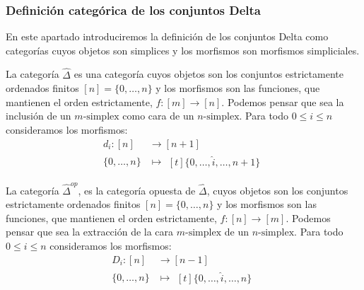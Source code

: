 \documentclass[../main.tex]{subfiles}
\begin{document}
\subsubsection{Definici\'on categ\'orica de los conjuntos Delta}
En este apartado introduciremos la definici\'on de los conjuntos Delta como categor\'ias cuyos objetos son simplices y los morfismos son morfismos simpliciales.
\begin{defi}
    La categor\'ia $\hat{\Delta}$ es una categor\'ia cuyos objetos son los conjuntos estrictamente ordenados finitos $[n] = \{0,\dots,n\}$ y los morfismos son las funciones, que mantienen el orden estrictamente, $f\colon [m] \to [n]$. Podemos pensar que sea la inclusi\'on de un $m\text{-simplex}$ como cara de un $n\text{-simplex}$.
    Para todo $0\le i \le n$ consideramos los morfismos:
    \begin{align*}
        d_i: [n]      & \longrightarrow [n+1] \\
        \{0,\dots,n\} & \longmapsto\!
        \begin{aligned}[t]
            \{0,\dots, \hat{i}, \dots,n+1\}
        \end{aligned}
    \end{align*}
\end{defi}

\begin{defi}
    La categor\'ia $\hat{\Delta}^{op}$, es la categor\'ia opuesta de $\hat{\Delta}$, cuyos objetos son los conjuntos estrictamente ordenados finitos $[n] = \{0,\dots,n\}$ y los morfismos son las funciones, que mantienen el orden estrictamente, $f: [n] \to [m]$. Podemos pensar que sea la extracci\'on de la cara $m\text{-simplex}$ de un $n\text{-simplex}$.
    Para todo $0\le i \le n$ consideramos los morfismos:
    \begin{align*}
        D_i: [n]      & \longrightarrow [n-1] \\
        \{0,\dots,n\} & \longmapsto\!
        \begin{aligned}[t]
            \{0,\dots, \hat{i}, \dots,n\}
        \end{aligned}
    \end{align*}
\end{defi}
\end{document}
